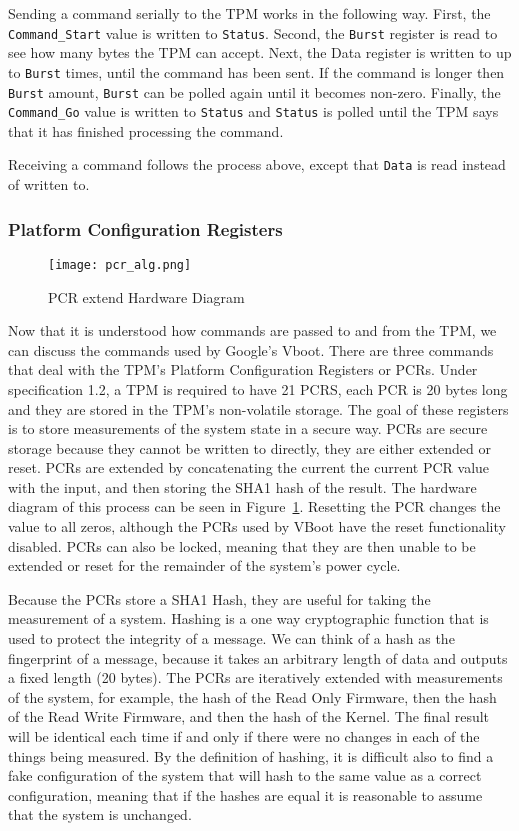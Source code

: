 \documentclass[../report.tex]{subfiles}
\def\code#1{\texttt{#1}}
\begin{document}
Sending a command serially to the TPM works in the following way.
First, the \code{Command\_Start} value is written to \code{Status}.
Second, the \code{Burst} register is read to see how many bytes the TPM can accept.
Next, the Data register is written to up to \code{Burst} times, until the command has been sent.
If the command is longer then \code{Burst} amount, \code{Burst} can be polled again until it becomes non-zero.
Finally, the \code{Command\_Go} value is written to \code{Status} and \code{Status} is polled until the TPM says that it has finished processing the command.

Receiving a command follows the process above, except that \code{Data} is read instead of written to.

\subsubsection{Platform Configuration Registers}

\begin{figure}
  \centering
  \texttt{[image: pcr\_alg.png]}
  \caption{PCR extend Hardware Diagram}
  \label{fig:pcr_alg}
\end{figure}

Now that it is understood how commands are passed to and from the TPM, we can discuss the commands used by Google's Vboot.
There are three commands that deal with the TPM's Platform Configuration Registers or PCRs.
Under specification 1.2, a TPM is required to have 21 PCRS, each PCR is 20 bytes long and they are stored in the TPM's non-volatile storage.
The goal of these registers is to store measurements of the system state in a secure way. 
PCRs are secure storage because they cannot be written to directly, they are either extended or reset. 
PCRs are extended by concatenating the current the current PCR value with the input, and then storing the SHA1 hash of the result. 
The hardware diagram of this process can be seen in Figure~\ref{fig:pcr_alg}.
Resetting the PCR changes the value to all zeros, although the PCRs used by VBoot have the reset functionality disabled.
PCRs can also be locked, meaning that they are then unable to be extended or reset for the remainder of the system's power cycle.

Because the PCRs store a SHA1 Hash, they are useful for taking the measurement of a system.  
Hashing is a one way cryptographic function that is used to protect the integrity of a message.
We can think of a hash as the fingerprint of a message, because it takes an arbitrary length of data and outputs a fixed length (20 bytes).
The PCRs are iteratively extended with measurements of the system, for example, the hash of the Read Only Firmware, then the hash of the Read Write Firmware, and then the hash of the Kernel.
The final result will be identical each time if and only if there were no changes in each of the things being measured.
By the definition of hashing, it is difficult also to find a fake configuration of the system that will hash to the same value as a correct configuration, meaning that if the hashes are equal it is reasonable to assume that the system is unchanged. 
\end{document}
